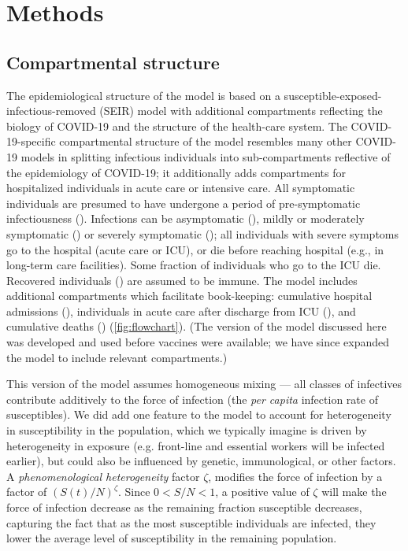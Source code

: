 \documentclass[12pt]{article}\usepackage[]{graphicx}\usepackage[]{color}
\begin{document}
\section{Methods}

\subsection*{Compartmental structure}

The epidemiological structure of the model is based on a susceptible-exposed-infectious-removed (SEIR) model with additional compartments reflecting the biology of COVID-19 and the structure of the health-care system. 
The COVID-19-specific compartmental structure of the model resembles many other COVID-19 models \cite{childs2021impact, tuite2020mathematical}  in splitting infectious individuals into sub-compartments reflective of the epidemiology of COVID-19; it additionally adds compartments for hospitalized individuals in acute care or intensive care. 
All symptomatic individuals are presumed to have undergone a period of pre-symptomatic infectiousness (). 
Infections can be asymptomatic (), mildly or moderately symptomatic () or severely symptomatic (); all individuals with severe symptoms go to the hospital (acute care or ICU), or die before reaching hospital (e.g., in long-term care facilities).
Some fraction of individuals who go to the ICU die. Recovered individuals () are assumed to be immune.  
The model includes additional compartments which facilitate book-keeping: cumulative hospital admissions (), individuals in acute care after discharge from ICU (), and cumulative deaths () (\cref{fig:flowchart}).
(The version of the model discussed here was developed and used before vaccines were available; we have since expanded the model to include relevant compartments.)

This version of the model assumes homogeneous mixing --- all classes of infectives contribute additively to the force of infection (the \emph{per capita} infection rate of susceptibles).
We did add one feature to the model to account for heterogeneity in susceptibility in the population, which we typically imagine is driven by heterogeneity in exposure (e.g. front-line and essential workers will be infected earlier), but could also be influenced by genetic, immunological, or other factors.
A \emph{phenomenological heterogeneity} factor $\zeta$, modifies the force of infection by a factor of $\left(S(t)/N\right)^\zeta$. Since $0 < S/N < 1$, a positive value of $\zeta$ will make the force of infection decrease as the remaining fraction susceptible decreases, capturing the fact that as the most susceptible individuals are infected, they lower the average level of susceptibility in the remaining population.
  
\end{document}
